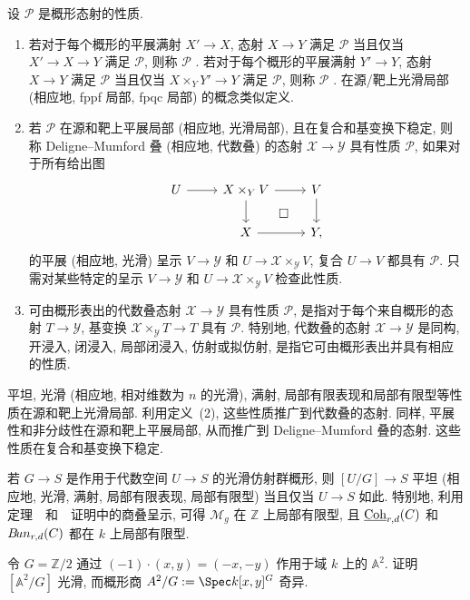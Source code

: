 \begin{definition}\label{src:4.3.2}
设 $\mathcal P$ 是概形态射的性质.
\begin{enumerate}[(1)]
\item 若对于每个概形的平展满射 $X'\to X$, 态射 $X\to Y$ 满足 $\mathcal P$ 当且仅当 $X'\to X\to Y$ 满足 $\mathcal P$, 则称 $\mathcal P$ . 若对于每个概形的平展满射 $Y'\to Y$, 态射 $X\to Y$ 满足 $\mathcal P$ 当且仅当 $X\times_Y Y'\to Y$ 满足 $\mathcal P$, 则称 $\mathcal P$ . 在源/靶上光滑局部 (相应地, fppf 局部, fpqc 局部) 的概念类似定义.
\item 若 $\mathcal P$ 在源和靶上平展局部 (相应地, 光滑局部), 且在复合和基变换下稳定, 则称 Deligne--Mumford 叠 (相应地, 代数叠) 的态射 $\mathcal X\to\mathcal Y$ 具有性质 $\mathcal P$, 如果对于所有给出图
\[
\begin{tikzcd}
U\arrow[r]&\mathcal X\times_{\mathcal Y}V\arrow[r]\arrow[d]\arrow[dr,phantom,"\square"]&V\arrow[d]\\
{}&\mathcal X\arrow[r]&\mathcal Y,
\end{tikzcd}
\]
的平展 (相应地, 光滑) 呈示 $V\to\mathcal Y$ 和 $U\to\mathcal X\times_{\mathcal Y}V$, 复合 $U\to V$ 都具有 $\mathcal P$. 只需对某些特定的呈示 $V\to\mathcal Y$ 和 $U\to\mathcal X\times_{\mathcal Y}V$ 检查此性质.
\item 可由概形表出的代数叠态射 $\mathcal X\to\mathcal Y$ 具有性质 $\mathcal P$, 是指对于每个来自概形的态射 $T\to\mathcal Y$, 基变换 $\mathcal X\times_{\mathcal Y}T\to T$ 具有 $\mathcal P$. 特别地, 代数叠的态射 $\mathcal X\to\mathcal Y$ 是同构, 开浸入, 闭浸入, 局部闭浸入, 仿射或拟仿射, 是指它可由概形表出并具有相应的性质.
\end{enumerate}
\end{definition}
平坦, 光滑 (相应地, 相对维数为 $n$ 的光滑), 满射, 局部有限表现和局部有限型等性质在源和靶上光滑局部. 利用定义~(2), 这些性质推广到代数叠的态射. 同样, 平展性和非分歧性在源和靶上平展局部, 从而推广到 Deligne--Mumford 叠的态射. 这些性质在复合和基变换下稳定.
\begin{example}\label{src:4.3.3}
若 $G\to S$ 是作用于代数空间 $U\to S$ 的光滑仿射群概形, 则 $[U/G]\to S$ 平坦 (相应地, 光滑, 满射, 局部有限表现, 局部有限型) 当且仅当 $U\to S$ 如此. 特别地, 利用定理~~和~~证明中的商叠呈示, 可得 $\mathcal M_g$ 在 $\mathbb Z$ 上局部有限型, 且 $\underline{\mathrm{Coh}}_{r,d}(C)$ 和 $B\!un_{r,d}(C)$ 都在 $k$ 上局部有限型.
\end{example}
\begin{exercise}[简单]\label{src:4.3.4}
令 $G=\mathbb Z/2$ 通过 $(-1)\cdot(x,y)=(-x,-y)$ 作用于域 $k$ 上的 $\mathbb A^2$. 证明 $[\mathbb A^2/G]$ 光滑, 而概形商 $\mathbb A^2/G:=\Spec k[x,y]^G$ 奇异.
\end{exercise}
